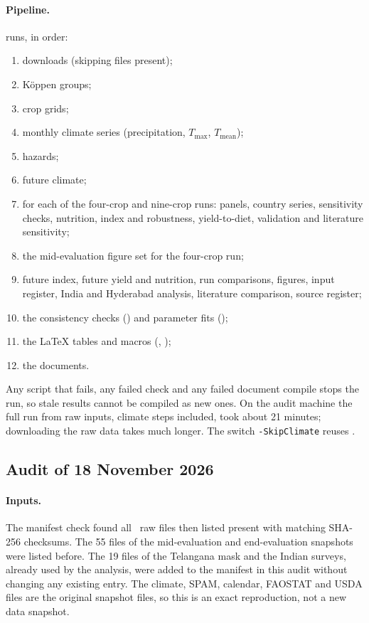 \paragraph{Pipeline.}  runs, in order:
\begin{enumerate}
\item downloads (skipping files present);
\item K\"oppen groups;
\item crop grids;
\item monthly climate series (precipitation, $T_{\max}$, $T_{\text{mean}}$);
\item hazards;
\item future climate;
\item for each of the four-crop and nine-crop runs: panels, country series, sensitivity checks, nutrition, index
and robustness, yield-to-diet, validation and literature sensitivity;
\item the mid-evaluation figure set for the four-crop run;
\item future index, future yield and nutrition, run comparisons, figures, input register, India and Hyderabad
analysis, literature comparison, source register;
\item the consistency checks () and parameter fits ();
\item the LaTeX tables and macros (, );
\item the documents.
\end{enumerate}
Any script that fails, any failed check and any failed document compile stops the run, so stale results cannot be
compiled as new ones. On the audit machine the full run from raw inputs, climate steps included, took about 21
minutes; downloading the raw data takes much longer. The switch \texttt{-SkipClimate} reuses .

\subsection{Audit of 18 November 2026}
\paragraph{Inputs.} The manifest check found all \manifestFilesAudit\ raw files then listed present with matching
SHA-256 checksums.
The 55 files of the mid-evaluation and end-evaluation snapshots were listed before. The 19 files of the
Telangana mask and the Indian surveys, already used by the analysis, were added to the manifest in this audit
without changing any existing entry. The climate, SPAM, calendar, FAOSTAT and USDA files are the original
snapshot files, so this is an exact reproduction, not a new data snapshot.


